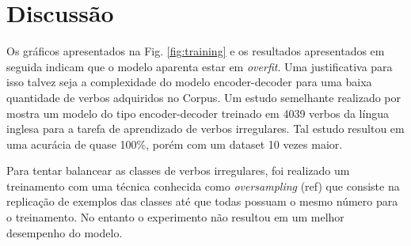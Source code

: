 \section{Discussão}

Os gráficos apresentados na Fig. \ref{fig:training} e os resultados apresentados em seguida indicam que o modelo aparenta estar em \textit{overfit}. Uma justificativa para isso talvez seja a complexidade do modelo encoder-decoder para uma baixa quantidade de verbos adquiridos no Corpus. Um estudo semelhante realizado por \cite{kirov:2018} mostra um modelo do tipo encoder-decoder treinado em 4039 verbos da língua inglesa para a tarefa de aprendizado de verbos irregulares. Tal estudo resultou em uma acurácia de quase 100\%, porém com um dataset 10 vezes maior.

Para tentar balancear as classes de verbos irregulares, foi realizado um treinamento com uma técnica conhecida como \textit{oversampling} (ref) que consiste na replicação de exemplos das classes até que todas possuam o mesmo número para o treinamento. No entanto o experimento não resultou em um melhor desempenho do modelo. 







